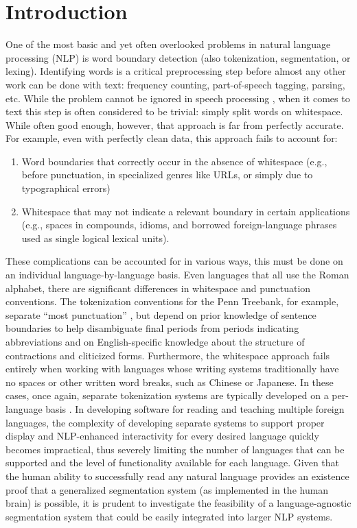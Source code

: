 \chapter{Introduction}
One of the most basic and yet often overlooked problems in natural language processing (NLP) is word boundary detection (also tokenization, segmentation, or lexing). Identifying words is a critical preprocessing step before almost any other work can be done with text: frequency counting, part-of-speech tagging, parsing, etc. While the problem cannot be ignored in speech processing \cite{varile97}, when it comes to text this step is often considered to be trivial: simply split words on whitespace. While often good enough, however, that approach is far from perfectly accurate. For example, even with perfectly clean data, this approach fails to account for:
\begin{enumerate}
	\item Word boundaries that correctly occur in the absence of whitespace (e.g., before punctuation, in specialized genres like URLs, or simply due to typographical errors)
	\item Whitespace that may not indicate a relevant boundary in certain applications (e.g., spaces in compounds, idioms, and borrowed foreign-language phrases used as single logical lexical units).
\end{enumerate}
These complications can be accounted for in various ways, this must be done on an individual language-by-language basis. Even languages that all use the Roman alphabet, there are significant differences in whitespace and punctuation conventions. The tokenization conventions for the Penn Treebank, for example, separate “most punctuation” \cite{treebank}, but depend on prior knowledge of sentence boundaries to help disambiguate final periods from periods indicating abbreviations and on English-specific knowledge about the structure of contractions and cliticized forms. Furthermore, the whitespace approach fails entirely when working with languages whose writing systems traditionally have no spaces or other written word breaks, such as Chinese or Japanese. In these cases, once again, separate tokenization systems are typically developed on a per-language basis \cite{peng04} \cite{suzuki00}.
In developing software for reading and teaching multiple foreign languages, the complexity of developing separate systems to support proper display and NLP-enhanced interactivity for every desired language quickly becomes impractical, thus severely limiting the number of languages that can be supported and the level of functionality available for each language. Given that the human ability to successfully read any natural language provides an existence proof that a generalized segmentation system (as implemented in the human brain) is possible, it is prudent to investigate the feasibility of a language-agnostic segmentation system that could be easily integrated into larger NLP systems.
